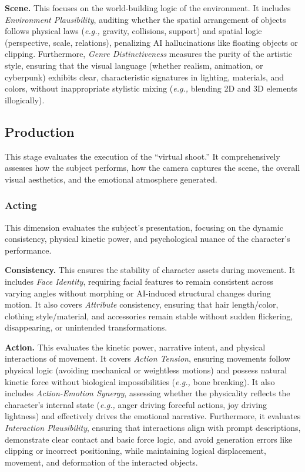 \documentclass{llmxive}
\begin{document}
\noindent
\textbf{Scene.} This focuses on the world-building logic of the environment. It includes \textit{Environment Plausibility}, auditing whether the spatial arrangement of objects follows physical laws (\textit{e.g.,} gravity, collisions, support) and spatial logic (perspective, scale, relations), penalizing AI hallucinations like floating objects or clipping. Furthermore, \textit{Genre Distinctiveness} measures the purity of the artistic style, ensuring that the visual language (whether realism, animation, or cyberpunk) exhibits clear, characteristic signatures in lighting, materials, and colors, without inappropriate stylistic mixing (\textit{e.g.,} blending 2D and 3D elements illogically).

\subsection{Production}
This stage evaluates the execution of the ``virtual shoot.'' It comprehensively assesses how the subject performs, how the camera captures the scene, the overall visual aesthetics, and the emotional atmosphere generated.

\subsubsection{Acting}
\noindent
This dimension evaluates the subject's presentation, focusing on the dynamic consistency, physical kinetic power, and psychological nuance of the character's performance.

\noindent
\textbf{Consistency.} This ensures the stability of character assets during movement. It includes \textit{Face Identity}, requiring facial features to remain consistent across varying angles without morphing or AI-induced structural changes during motion. It also covers \textit{Attribute} consistency, ensuring that hair length/color, clothing style/material, and accessories remain stable without sudden flickering, disappearing, or unintended transformations.

\noindent
\textbf{Action.} This evaluates the kinetic power, narrative intent, and physical interactions of movement. It covers \textit{Action Tension}, ensuring movements follow physical logic (avoiding mechanical or weightless motions) and possess natural kinetic force without biological impossibilities (\textit{e.g.,} bone breaking). It also includes \textit{Action-Emotion Synergy}, assessing whether the physicality reflects the character's internal state (\textit{e.g.,} anger driving forceful actions, joy driving lightness) and effectively drives the emotional narrative. Furthermore, it evaluates \textit{Interaction Plausibility}, ensuring that interactions align with prompt descriptions, demonstrate clear contact and basic force logic, and avoid generation errors like clipping or incorrect positioning, while maintaining logical displacement, movement, and deformation of the interacted objects.
\end{document}
